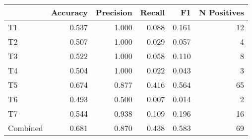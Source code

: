 \begin{tabular}{lrrrrr}
\toprule
{} &  Accuracy &  Precision &  Recall &     F1 &  N Positives \\
\midrule
T1       &     0.537 &      1.000 &   0.088 &  0.161 &           12 \\
T2       &     0.507 &      1.000 &   0.029 &  0.057 &            4 \\
T3       &     0.522 &      1.000 &   0.058 &  0.110 &            8 \\
T4       &     0.504 &      1.000 &   0.022 &  0.043 &            3 \\
T5       &     0.674 &      0.877 &   0.416 &  0.564 &           65 \\
T6       &     0.493 &      0.500 &   0.007 &  0.014 &            2 \\
T7       &     0.544 &      0.938 &   0.109 &  0.196 &           16 \\
Combined &     0.681 &      0.870 &   0.438 &  0.583 &           69 \\
\bottomrule
\end{tabular}
